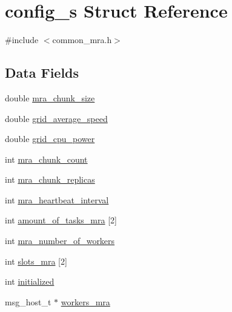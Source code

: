 \hypertarget{structconfig__s}{\section{config\-\_\-s \-Struct \-Reference}
\label{structconfig__s}
}


{\ttfamily \#include $<$common\-\_\-mra.\-h$>$}

\subsection*{\-Data \-Fields}
\begin{DoxyCompactItemize}
\item 
double \hyperlink{structconfig__s_a33bd48451a5304468d1a438573193d92}{mra\-\_\-chunk\-\_\-size}
\item 
double \hyperlink{structconfig__s_a6bc024fc05bd7ee560aa58399e4ed39b}{grid\-\_\-average\-\_\-speed}
\item 
double \hyperlink{structconfig__s_a907f6cdbc6d12af5e2eaacc353c88873}{grid\-\_\-cpu\-\_\-power}
\item 
int \hyperlink{structconfig__s_ac38b035ee453f7d1c10d3f7632d2b01f}{mra\-\_\-chunk\-\_\-count}
\item 
int \hyperlink{structconfig__s_a0b7717717cfcdb2a44683a0c88fbd4a2}{mra\-\_\-chunk\-\_\-replicas}
\item 
int \hyperlink{structconfig__s_a705e55f5c2e8ea0d55c129a81c06654e}{mra\-\_\-heartbeat\-\_\-interval}
\item 
int \hyperlink{structconfig__s_a102493327d4f5a14ddd3c5d42dd36b74}{amount\-\_\-of\-\_\-tasks\-\_\-mra} \mbox{[}2\mbox{]}
\item 
int \hyperlink{structconfig__s_a3a5b8a103b3cb1934cfb1aa58a1e4d86}{mra\-\_\-number\-\_\-of\-\_\-workers}
\item 
int \hyperlink{structconfig__s_af8edcffd357e2d4087165a18b2c3e767}{slots\-\_\-mra} \mbox{[}2\mbox{]}
\item 
int \hyperlink{structconfig__s_a0c33578ad98e034d6ef2fa0563f64a10}{initialized}
\item 
msg\-\_\-host\-\_\-t $\ast$ \hyperlink{structconfig__s_a25044c7b99a27e3823ec661de25d38d5}{workers\-\_\-mra}
\end{DoxyCompactItemize}


